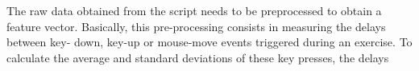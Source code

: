 \documentclass[a4paper,twoside]{article}
\begin{document}


The raw data
obtained from the script needs to be preprocessed to obtain a feature vector.
Basically, this pre-processing consists in measuring the delays between key-
down, key-up or mouse-move events triggered during an exercise.
%
%
To calculate the average and standard deviations of these key presses, the delays
\end{document}
